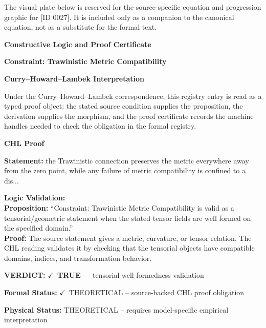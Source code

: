 \begingroup\footnotesize\sloppy
The visual plate below is reserved for the source-specific equation and progression graphic for [ID 0027]. It is included only as a companion to the canonical equation, not as a substitute for the formal text.
\par\endgroup
\ifTZPDarkEdition
{}
\fi

\clearpage
\begingroup\tzpsupportsetup
\noindent\textbf{\fontsize{10.8pt}{12.8pt}\selectfont [ID 0027] Constructive Logic and Proof Certificate}\par
\noindent\textbf{\fontsize{10pt}{12pt}\selectfont Constraint: Trawinistic Metric Compatibility}\par
\vspace{0.45em}
\begingroup
\footnotesize
\setlength{\parskip}{0.22em}
\setlength{\parindent}{0pt}
\noindent\textbf{Curry--Howard--Lambek Interpretation}\par
Under the Curry--Howard--Lambek correspondence, this registry entry is read as a typed proof
object: the stated source condition supplies the proposition, the derivation supplies the
morphism, and the proof certificate records the machine handles needed to check the obligation
in the formal registry.

\vspace{0.45em}
\noindent\textbf{CHL Proof}\par
\textbf{Statement:} the Trawinistic connection preserves the metric everywhere away from the zero point,
while any failure of metric compatibility is confined to a dis...

\textbf{Logic Validation:}\\
\textbf{Proposition:} ``Constraint: Trawinistic Metric Compatibility is valid as a tensorial/geometric statement
when the stated tensor fields are well formed on the specified domain.''\\
\textbf{Proof:} The source statement gives a metric, curvature, or tensor relation. The CHL reading
validates it by checking that the tensorial objects have compatible domains, indices,
and transformation behavior.

\textbf{VERDICT:} \ensuremath{\checkmark}\ \textbf{TRUE} --- tensorial well-formedness validation

\textbf{Formal Status:} \ensuremath{\checkmark}\ THEORETICAL -- source-backed CHL proof obligation

\textbf{Physical Status:} THEORETICAL -- requires model-specific empirical interpretation
\par\vspace{0.45em}
\par
\ifTZPDarkEdition
{}
\fi
\endgroup
\endgroup
